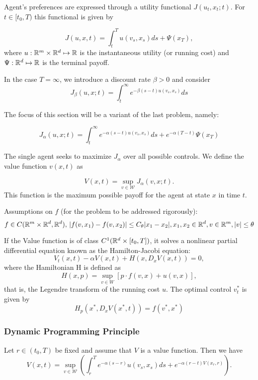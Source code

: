 \documentclass{article}
\begin{document}
Agent's preferences are expressed through a utility functional $J(u_t, x_t; t)$. For $t \in [t_0,T)$ this functional is given by 

$$
J(u,x,t) = \int_t^T u(v_s, x_s) ds + \Psi(x_T),
$$
where $u : \mathbb{R}^m\times \mathbb{R}^d \mapsto \mathbb{R}$ is the instantaneous utility (or running cost) and $\Psi : \mathbb{R}^d \mapsto \mathbb{R}$ is the terminal payoff.

In the case $T = \infty$, we introduce a discount rate $\beta > 0$ and consider
$$
J_\beta (u,x;t) = \int_t^\infty e^{-\beta (s - t) u(v_s, x_s)} ds 
$$

The focus of this section will be a variant of the last problem, namely:

$$
J_\alpha (u,x;t) = \int_t^\infty e^{-\alpha (s - t) u(v_s, x_s)} ds + e^{-\alpha (T -t)} \Psi(x_T) 
$$

The single agent seeks to maximize $J_\alpha$ over all possible controls.
We define the value function $v(x,t)$ as

$$
V(x,t) = \sup_{v\in \mathcal{W}} J_\alpha (v, x ; t).
$$
This function is the maximum possible payoff for the agent at state $x$ in time $t$.

Assumptions on $f$ (for the problem to be addressed rigorously):
$$f \in C(\mathbb{R}^m \times \mathbb{R}^d, \mathbb{R}^d),\, |f(v, x_1) - f(v, x_2)| \leq C_\theta |x_1 - x_2|, x_1, x_2 \in \mathbb{R}^d, v\in \mathbb{R}^m, |v| \leq \theta$$

If the Value function is of class $C^1(\mathbb{R}^d \times [t_0,T])$, it solves  a nonlinear partial differential equation known as the Hamilton-Jacobi equation:
$$V_t(x,t) - \alpha V(x,t) + H(x,D_x V(x,t)) = 0,$$
where the Hamiltonian H is defined as 
$$H(x,p) = \sup_{v\in W} [p \cdot f(v,x) + u(v,x)],$$
that is, the Legendre transform of the running cost $u$.
The optimal control $v_t^*$ is given by 
$$ H_p (x^*, D_x V(x^*,t)) = f(v^*, x^*)$$

\subsubsection{Dynamic Programming Principle}

\begin{proposition}
    Let $r \in (t_0, T)$ be fixed and assume that $V$ is a value function. Then we have
    $$
    V(x,t) = \sup_{v\in \mathcal{W}} \left( \int_r^T e^{-\alpha (s-r)} u(v_s,x_s) ds + e^{-\alpha (r - t) V(x_r,r)} \right).
    $$
\end{proposition}
\end{document}

